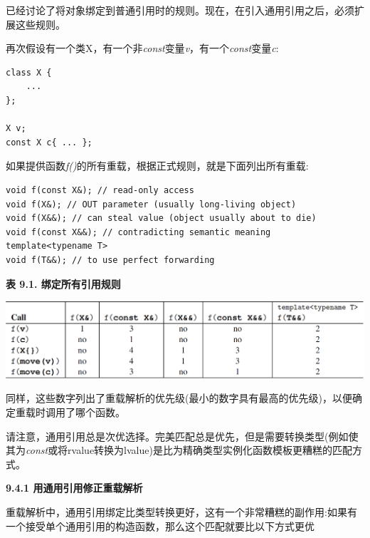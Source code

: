 已经讨论了将对象绑定到普通引用时的规则。现在，在引入通用引用之后，必须扩展这些规则。\par

再次假设有一个类X，有一个非\textit{const}变量\textit{v}，有一个\textit{const}变量\textit{c}:\par

\begin{lstlisting}[caption={}]
class X {
	...
};

X v;
const X c{ ... };
\end{lstlisting}

如果提供函数\textit{f()}的所有重载，根据正式规则，就是下面列出所有重载:\par

\begin{lstlisting}[caption={}]
void f(const X&); // read-only access
void f(X&); // OUT parameter (usually long-living object)
void f(X&&); // can steal value (object usually about to die)
void f(const X&&); // contradicting semantic meaning
template<typename T>
void f(T&&); // to use perfect forwarding
\end{lstlisting}

\hspace*{\fill} \par %
\textbf{表 9.1. 绑定所有引用规则}
\begin{center}
	\includegraphics[width=1.0\textwidth]{content/2/chapter9/images/1}
\end{center}

同样，这些数字列出了重载解析的优先级(最小的数字具有最高的优先级)，以便确定重载时调用了哪个函数。\par

请注意，通用引用总是次优选择。完美匹配总是优先，但是需要转换类型(例如使其为\textit{const}或将rvalue转换为lvalue)是比为精确类型实例化函数模板更糟糕的匹配方式。\par

\hspace*{\fill} \par %
\textbf{9.4.1 用通用引用修正重载解析}

重载解析中，通用引用绑定比类型转换更好，这有一个非常糟糕的副作用:如果有一个接受单个通用引用的构造函数，那么这个匹配就要比以下方式更优\par


